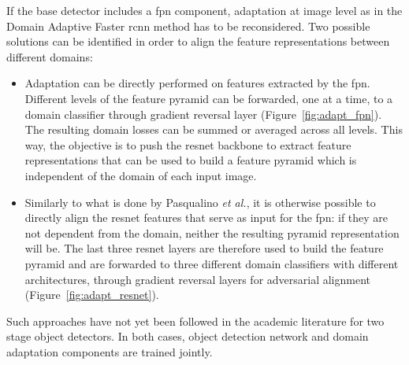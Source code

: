 \documentclass[%
    corpo=12pt,
    twoside,
    stile=classica,   
    tipotesi=magistrale,
    evenboxes,
    english,
	numerazioneromana,
]{toptesi}
\begin{document}
\bigskip
If the base detector includes a \gls{fpn} component, adaptation at image level as in the Domain Adaptive Faster \gls{rcnn} method has to be reconsidered. Two possible solutions can be identified in order to align the feature representations between different domains:
\begin{itemize}
	\item Adaptation can be directly performed on features extracted by the \gls{fpn}. Different levels of the feature pyramid can be forwarded, one at a time, to a domain classifier through gradient reversal layer (Figure~\ref{fig:adapt_fpn}). The resulting domain losses can be summed or averaged across all levels. This way, the objective is to push the \gls{resnet} backbone to extract feature representations that can be used to build a feature pyramid which is independent of the domain of each input image.
	\item Similarly to what is done by Pasqualino \textit{et al.}\cite{pasqualino2020unsupervised}, it is otherwise possible to directly align the \gls{resnet} features that serve as input for the \gls{fpn}: if they are not dependent from the domain, neither the resulting pyramid representation will be. The last three \gls{resnet} layers are therefore used to build the feature pyramid and are forwarded to three different domain classifiers with different architectures, through gradient reversal layers for adversarial alignment (Figure~\ref{fig:adapt_resnet}).
\end{itemize}
Such approaches have not yet been followed in the academic literature for two stage object detectors. In both cases, object detection network and domain adaptation components are trained jointly.
\end{document}
